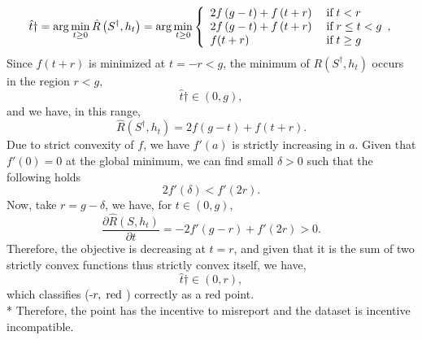 \documentclass{article}
\begin{document}
\begin{equation} \hat{t}\dagger = \arg\displaystyle\min_{t \geq  0} \hat{R}\left(S^{\dagger}, h_{t}\right) = \arg\displaystyle\min_{t \geq  0}\left\{ \begin{array}{ll}
2 f\left(g - t\right) + f\left(t + r\right)& \text{\;if\;} t < r \\
2 f\left(g - t\right) + f\left(t + r\right)& \text{\;if\;} r \leq  t < g \\
f(t + r)& \text{\;if\;} t \geq  g \\
\end{array},\right. \end{equation}
Since $f\left(t + r\right) $ is minimized at $t  = -r < g $, the minimum of $R\left(S^{\dagger}, h_{t}\right) $ occurs in the region $r  < g, $
\begin{equation} 
\hat{t}\dagger \in \left(0, g \right),
\end{equation}
and we have, in this range,
\begin{equation} 
\hat{R}\left(S^{\dagger}, h_{t}\right) = 2 f\left(g - t\right) + f\left(t + r\right).
\end{equation}
Due to strict convexity of $f $, we have $f'\left(a\right)$ is strictly increasing in $a $. Given that $f'\left(0\right) = 0$ at the global minimum, we can find small $\delta > 0$ such that the following holds
\begin{equation} 
2 f'\left(\delta\right) < f'\left(2 r\right) .
\end{equation}
Now, take $r  = g - \delta$, we have, for $t  \in \left(0, g \right)$,
\begin{equation} 
\dfrac{\partial \hat{R}\left(S, h_{t}\right)}{\partial t} = - 2 f'\left(g - r\right) + f'\left(2 r\right) > 0.
\end{equation}
Therefore, the objective is decreasing at $t  = r $, and given that it is the sum of two strictly convex functions thus strictly convex itself, we have,
\begin{equation} 
\hat{t}\dagger \in \left(0, r \right),
\end{equation}
which classifies (-$r , \text{\;red\;}$) correctly as a red point.
\\* Therefore, the point has the incentive to misreport and the dataset is incentive incompatible.
\newline \newline
\end{document}
